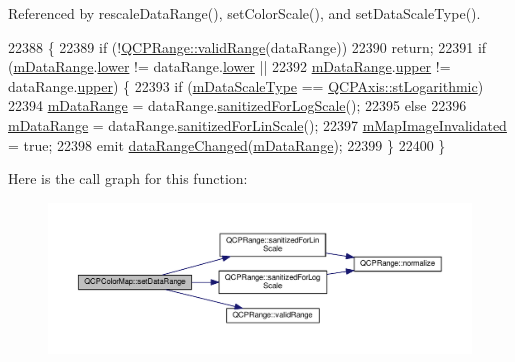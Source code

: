 Referenced by rescale\+Data\+Range(), set\+Color\+Scale(), and set\+Data\+Scale\+Type().


\begin{DoxyCode}
22388                                                         \{
22389   \textcolor{keywordflow}{if} (!\hyperlink{class_q_c_p_range_ab38bd4841c77c7bb86c9eea0f142dcc0}{QCPRange::validRange}(dataRange))
22390     \textcolor{keywordflow}{return};
22391   \textcolor{keywordflow}{if} (\hyperlink{class_q_c_p_color_map_ab87609621d16cd3e9d52ad070b327b08}{mDataRange}.\hyperlink{class_q_c_p_range_aa3aca3edb14f7ca0c85d912647b91745}{lower} != dataRange.\hyperlink{class_q_c_p_range_aa3aca3edb14f7ca0c85d912647b91745}{lower} ||
22392       \hyperlink{class_q_c_p_color_map_ab87609621d16cd3e9d52ad070b327b08}{mDataRange}.\hyperlink{class_q_c_p_range_ae44eb3aafe1d0e2ed34b499b6d2e074f}{upper} != dataRange.\hyperlink{class_q_c_p_range_ae44eb3aafe1d0e2ed34b499b6d2e074f}{upper}) \{
22393     \textcolor{keywordflow}{if} (\hyperlink{class_q_c_p_color_map_ab28a4b2def408f83b9818799d5f18446}{mDataScaleType} == \hyperlink{class_q_c_p_axis_a36d8e8658dbaa179bf2aeb973db2d6f0abf5b785ad976618816dc6f79b73216d4}{QCPAxis::stLogarithmic})
22394       \hyperlink{class_q_c_p_color_map_ab87609621d16cd3e9d52ad070b327b08}{mDataRange} = dataRange.\hyperlink{class_q_c_p_range_aaf6a9046e78d91eeb8e89584fe46b034}{sanitizedForLogScale}();
22395     \textcolor{keywordflow}{else}
22396       \hyperlink{class_q_c_p_color_map_ab87609621d16cd3e9d52ad070b327b08}{mDataRange} = dataRange.\hyperlink{class_q_c_p_range_a1ff029704c29a75adbc1dc36cecaf44c}{sanitizedForLinScale}();
22397     \hyperlink{class_q_c_p_color_map_ac9aea6a5c193d7fa866bc7b26e79ef2c}{mMapImageInvalidated} = \textcolor{keyword}{true};
22398     emit \hyperlink{class_q_c_p_color_map_a482980f2335d09cfb36dd95ba9663197}{dataRangeChanged}(\hyperlink{class_q_c_p_color_map_ab87609621d16cd3e9d52ad070b327b08}{mDataRange});
22399   \}
22400 \}
\end{DoxyCode}


Here is the call graph for this function\+:\nopagebreak
\begin{figure}[H]
\begin{center}
\leavevmode
\includegraphics[width=350pt]{class_q_c_p_color_map_a980b42837821159786a85b4b7dcb8774_cgraph}
\end{center}
\end{figure}




